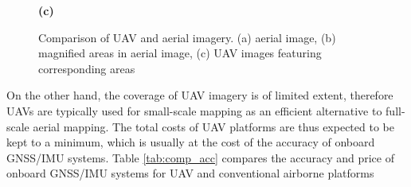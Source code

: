 \documentclass[%
  headings = standardclasses, %
]{tumDiss}
\newif\ifblackandwhitecycle
\gdef\patternnumber{0}
\gdef\patternnumber{1}
\gdef\patternnumber{1}
\gdef\patternnumber{0}
\gdef\columncount{1}
\gdef\rowcount{1}
\newcommand\zoombox[2][]{
    \begin{scope}[zoombox paths]
        \pgfmathsetmacro\xpos{
            (\columncount-1)*(\imagewidth / \pgfkeysvalueof{/tikz/zoomboxarray columns} + \pgfkeysvalueof{/tikz/zoomboxarray inner gap} / \pgfkeysvalueof{/tikz/zoomboxarray columns} ) + \pgflinewidth
        }
        \pgfmathsetmacro\ypos{
            (\rowcount-1)*( \imageheight / \pgfkeysvalueof{/tikz/zoomboxarray rows} + \pgfkeysvalueof{/tikz/zoomboxarray inner gap} / \pgfkeysvalueof{/tikz/zoomboxarray rows} ) + 0.5*\pgflinewidth
        }
        \edef\dospy{\noexpand\spy [
            #1,
            zoombox paths/.append style={
                black and white pattern=\patternnumber
            },
            every spy on node/.append style={#1},
            x=\imagewidth,
            y=\imageheight
        ] on (#2) in node [anchor=north west] at ($(zoomboxes container.north west)+(\xpos pt,-\ypos pt)$);}
        \dospy
        \pgfmathtruncatemacro\pgfmathresult{ifthenelse(\columncount==\pgfkeysvalueof{/tikz/zoomboxarray columns},\rowcount+1,\rowcount)}
        \global\let\rowcount=\pgfmathresult
        \pgfmathtruncatemacro\pgfmathresult{ifthenelse(\columncount==\pgfkeysvalueof{/tikz/zoomboxarray columns},1,\columncount+1)}
        \global\let\columncount=\pgfmathresult
        \ifblackandwhitecycle
            \pgfmathtruncatemacro{\newpatternnumber}{\patternnumber+1}
            \global\edef\patternnumber{\newpatternnumber}
        \fi
    \end{scope}
}
\begin{document}
\begin{figure}[ht]\centering
 \begin{subfigure}{0.99\columnwidth}
 \end{subfigure}

 \begin{subfigure}{0.244\columnwidth}
   \centering
{}
 \end{subfigure}
  \begin{subfigure}{0.244\columnwidth}
   \centering
{}
 \end{subfigure}
  \begin{subfigure}{0.244\columnwidth}
   \centering
{}
 \end{subfigure}
  \begin{subfigure}{0.244\columnwidth}
   \centering
{}
 \end{subfigure}
\vspace{1.1\baselineskip}
\centerline{\textbf{(c)}}
 \caption{Comparison of UAV and aerial imagery. (a) aerial image, (b) magnified areas in aerial image, (c) UAV images featuring corresponding areas}
\end{figure}
 
On the other hand, the coverage of UAV imagery is of limited extent, therefore UAVs are typically used for small-scale mapping as an efficient alternative to full-scale aerial mapping. The total costs of UAV platforms are thus expected to be kept to a minimum, which is usually at the cost of the accuracy of onboard GNSS/IMU systems. Table \ref{tab:comp_acc} compares the accuracy and price of onboard GNSS/IMU systems for UAV and conventional airborne platforms
\end{document}

